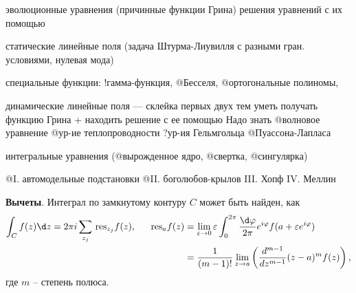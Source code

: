 эволюционные уравнения (причинные функции Грина)
решения уравнений с их помощью

статические линейные поля (задача Штурма-Лиувилля с разными гран. условиями, нулевая мода)

специальные функции: 
	!гамма-функция, 
	@Бесселя, 
	@ортогональные полиномы, 



динамические линейные поля — склейка первых двух тем 
	уметь получать функцию Грина 
	+ находить решение с ее помощью
	Надо знать 
		@волновое уравнение
		@ур-ие теплопроводности
		?ур-ия Гельмгольца
		@Пуассона-Лапласа

интегральные уравнения (@вырожденное ядро, @свертка, @сингулярка)

	@I. автомодельные подстановки
	@II. боголюбов-крылов
	III. Хопф
	IV. Меллин


\textbf{Вычеты}. Интеграл по замкнутому контуру $C$ может быть найден, как
\begin{align*}
    \int_C f(z) \d z = 2 \pi i \sum_{z_j} \,\text{res}_{z_j} f(z),
    \hspace{5 mm} 
    \,\text{res}_{a} f(z) &= \lim_{\varepsilon \to 0} \varepsilon \int_0^{2\pi} \frac{\d \varphi}{2\pi} e^{i \varphi} f(a + \varepsilon e^{i \varphi}) \\ 
    &= \frac{1}{(m-1)!} \lim_{z \to a} \left(
        \frac{d^{m-1} }{d z^{m-1}} (z-a)^m f(z)
    \right),
\end{align*}
где $m$ -- степень полюса. 